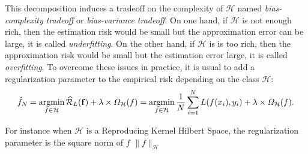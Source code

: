 This decomposition induces a tradeoff on the complexity of $\mathcal{H}$ named \emph{bias-complexity tradeoff} or \emph{bias-variance tradeoff}. On one hand, if $\mathcal{H}$ is not enough rich, then the estimation risk would be small but the approximation error can be large, it is called \emph{underfitting}. On the other hand, if $\mathcal{H}$ is is too rich, then the approximation risk would be small but the estimation error large, it is called \emph{overfitting}. To overcome these issues in practice, it is usual to add a regularization parameter to the empirical risk depending on the class $\mathcal{H}$:
\begin{align*}
    \hat{f}_N = \operatorname*{argmin}_{f\in\mathcal{H}}\widehat{\mathcal{R}}_{L}(\mathbf{f}) +\lambda\times\Omega_\mathcal{H}(f)= \operatorname*{argmin}_{f\in\mathcal{H}}\frac{1}{N}\sum_{i=1}^N L(f(x_i),y_i)+\lambda\times\Omega_\mathcal{H}(f).
\end{align*}

For instance when $\mathcal{H}$ is a Reproducing Kernel Hilbert Space, the regularization parameter is the square norm of $f$ $\lVert f\rVert_\mathcal{H}$




